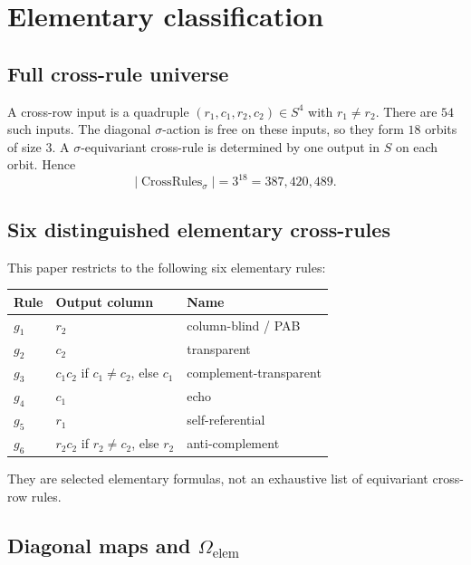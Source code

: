 \documentclass[11pt]{article}
\begin{document}
\section{Elementary classification}

\subsection{Full cross-rule universe}

A cross-row input is a quadruple \((r_1,c_1,r_2,c_2)\in S^4\) with \(r_1\ne r_2\).
There are \(54\) such inputs. The diagonal \(\sigma\)-action is free on these
inputs, so they form \(18\) orbits of size \(3\). A \(\sigma\)-equivariant
cross-rule is determined by one output in \(S\) on each orbit. Hence
\[
|\operatorname{CrossRules}_\sigma|=3^{18}=387,420,489.
\]

\subsection{Six distinguished elementary cross-rules}

This paper restricts to the following six elementary rules:

\begin{center}
\small
\begin{longtable}{@{}>{\raggedright\arraybackslash}p{}>{\raggedright\arraybackslash}p{}>{\raggedright\arraybackslash}p{}@{}}
Rule & Output column & Name \\
\midrule
\(g_1\) & \(r_2\) & column-blind / PAB \\
\(g_2\) & \(c_2\) & transparent \\
\(g_3\) & \(c_1c_2\) if \(c_1\ne c_2\), else \(c_1\) & complement-transparent \\
\(g_4\) & \(c_1\) & echo \\
\(g_5\) & \(r_1\) & self-referential \\
\(g_6\) & \(r_2c_2\) if \(r_2\ne c_2\), else \(r_2\) & anti-complement \\
\end{longtable}
\end{center}

They are selected elementary formulas, not an exhaustive list of equivariant
cross-row rules.

\subsection[Diagonal maps and Omega-elem]{Diagonal maps and \(\Omega_{\mathrm{elem}}\)}
\end{document}

